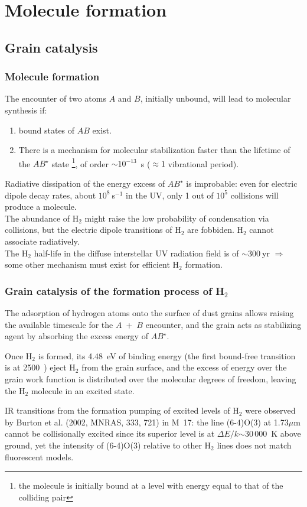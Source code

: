 \section{Molecule formation}

\subsection{Grain catalysis}

\begin{frame}\frametitle{Molecule formation}



The encounter of two atoms $A$ and $B$, initially unbound, will lead
to molecular synthesis if:
\begin{enumerate}
\item bound states of $AB$ exist.

\item There is a mechanism for molecular stabilization faster than the
lifetime of the $AB^\star$ state \footnote{the molecule is initially
bound at a level with energy equal to that of the colliding pair}, of
order  $\sim 10^{-13}$~s ($\approx 1$ vibrational period).
\end{enumerate}


Radiative dissipation of the energy excess of $AB^\star$ is
improbable: even for electric dipole decay rates, about
$10^8~$s$^{-1}$ in the UV, only 1 out of $10^5$ collisions will produce
a molecule.\\  

The abundance of H$_2$ might raise the low probability of condensation
via collisions, but the electric dipole transitions of H$_2$ are
fobbiden. H$_2$ cannot associate radiatively.\\

The H$_2$ half-life in the diffuse interstellar UV radiation field is
of $\sim 300~$yr $\Rightarrow$ some other mechanism must exist for
efficient H$_2$ formation. 


\end{frame} \begin{frame}\frametitle{Grain catalysis of the formation process of  H$_2$}

The adsorption of hydrogen atoms onto the surface of dust grains
allows raising the available timescale for the $A$~+~$B$ encounter,
and the grain acts as stabilizing agent by absorbing the excess energy
of $AB^\star$. 

Once H$_2$ is formed, its 4.48~eV of binding energy (the first
bound-free transition is at 2500~\angstrom) eject H$_2$ from the grain
surface, and the excess of energy over the grain work function is
distributed over the molecular degrees of freedom, leaving the H$_2$
molecule in an excited state. 


IR transitions from the formation pumping of excited levels of H$_2$
were observed by Burton et al. (2002, MNRAS, 333, 721) in M~17: the
line (6-4)O(3) at 1.73$\mu$m cannot be collisionally excited since its
superior level is at $\Delta E/k$$\sim$30\,000~K above ground, yet the
intensity of (6-4)O(3) relative to other H$_2$ lines does not match
fluorescent models.

\end{frame} 

